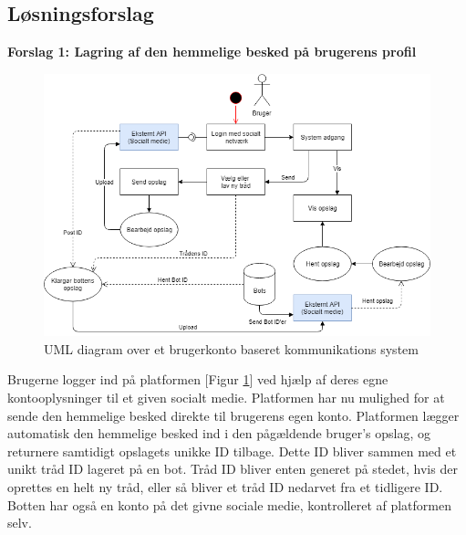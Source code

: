 \subsection{Løsningsforslag}
\label{userbased}
\textbf{Forslag 1: Lagring af den hemmelige besked på brugerens profil}
\begin{figure}[H]
    \centering
    \includegraphics[width=0.8\linewidth]{Projectdoc/Assets/Illustrationer/userbased-system.png}
    \caption{UML diagram over et brugerkonto baseret kommunikations system}
    \label{fig:userbased}
\end{figure}

Brugerne logger ind på platformen [Figur \ref{fig:userbased}] ved hjælp af deres egne kontooplysninger til et given socialt medie. Platformen har nu mulighed for at sende den hemmelige besked direkte til brugerens egen konto. Platformen lægger automatisk den hemmelige besked ind i den pågældende bruger's opslag, og returnere samtidigt opslagets unikke ID tilbage. Dette ID bliver sammen med et unikt tråd ID lageret på en bot. Tråd ID bliver enten generet på stedet, hvis der oprettes en helt ny tråd, eller så bliver et tråd ID nedarvet fra et tidligere ID. Botten har også en konto på det givne sociale medie, kontrolleret af platformen selv. 

